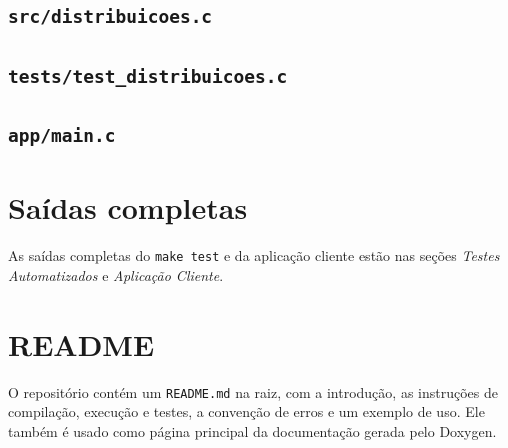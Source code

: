 \documentclass[12pt,a4paper]{article}
\newcommand{\cod}[1]{\texttt{#1}}
\newcommand{\fonte}[1]{}
\begin{document}
\subsection{\cod{src/distribuicoes.c}}
\fonte{../../src/distribuicoes.c}

\subsection{\cod{tests/test\_distribuicoes.c}}
\fonte{../../tests/test_distribuicoes.c}

\subsection{\cod{app/main.c}}
\fonte{../../app/main.c}

\section{Saídas completas}

As saídas completas do \cod{make test} e da aplicação cliente estão nas seções \emph{Testes Automatizados} e \emph{Aplicação Cliente}.

\section{README}

O repositório contém um \cod{README.md} na raiz, com a introdução, as instruções de compilação, execução e testes, a convenção de erros e um exemplo de uso. 
Ele também é usado como página principal da documentação gerada pelo Doxygen.
\end{document}
